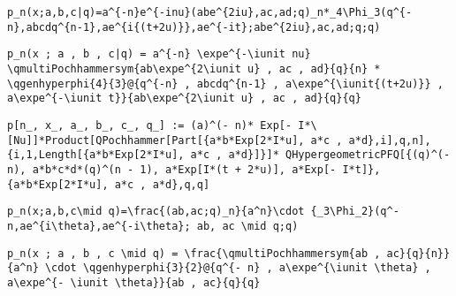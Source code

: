 \newsavebox\CXT
\begin{lrbox}{\CXT}
 \begin{minipage}[t]{0.82\textwidth}
  \lstinline[language={[latex]TeX},mathescape,breaklines=true]"p_n(x;a,b,c|q)=a^{-n}e^{-inu}(abe^{2iu},ac,ad;q)_n*_4\Phi_3(q^{-n},abcdq^{n-1},ae^{i{(t+2u)}},ae^{-it};abe^{2iu},ac,ad;q;q)"
 \end{minipage}
\end{lrbox}
\newsavebox\CXST
\begin{lrbox}{\CXST}
 \begin{minipage}[t]{0.82\textwidth}
  \lstinline[language={[latex]TeX},mathescape,breaklines=true]"p_n(x ; a , b , c|q) = a^{-n} \expe^{-\iunit nu} \qmultiPochhammersym{ab\expe^{2\iunit u} , ac , ad}{q}{n} * \qgenhyperphi{4}{3}@{q^{-n} , abcdq^{n-1} , a\expe^{\iunit{(t+2u)}} , a\expe^{-\iunit t}}{ab\expe^{2\iunit u} , ac , ad}{q}{q}"
 \end{minipage}
\end{lrbox}
\newsavebox\CXMM
\begin{lrbox}{\CXMM}
 \begin{minipage}[t]{0.82\textwidth}
  \lstinline[language={[latex]TeX},mathescape,breaklines=true]"p[n_, x_, a_, b_, c_, q_] := (a)^(- n)* Exp[- I*\[Nu]]*Product[QPochhammer[Part[{a*b*Exp[2*I*u], a*c , a*d},i],q,n],{i,1,Length[{a*b*Exp[2*I*u], a*c , a*d}]}]* QHypergeometricPFQ[{(q)^(- n), a*b*c*d*(q)^(n - 1), a*Exp[I*(t + 2*u)], a*Exp[- I*t]},{a*b*Exp[2*I*u], a*c , a*d},q,q]"
 \end{minipage}
\end{lrbox}
\newsavebox\CXMA
\begin{lrbox}{\CXMA}
 \begin{minipage}[t]{0.82\textwidth}
  \lstinline[language={[latex]TeX},mathescape,breaklines=true]""
 \end{minipage}
\end{lrbox}
\newsavebox\CYT
\begin{lrbox}{\CYT}
 \begin{minipage}[t]{0.82\textwidth}
  \lstinline[language={[latex]TeX},mathescape,breaklines=true]"p_n(x;a,b,c\mid q)=\frac{(ab,ac;q)_n}{a^n}\cdot {_3\Phi_2}(q^-n,ae^{i\theta},ae^{-i\theta}; ab, ac \mid q;q)"
 \end{minipage}
\end{lrbox}
\newsavebox\CYST
\begin{lrbox}{\CYST}
 \begin{minipage}[t]{0.82\textwidth}
  \lstinline[language={[latex]TeX},mathescape,breaklines=true]"p_n(x ; a , b , c \mid q) = \frac{\qmultiPochhammersym{ab , ac}{q}{n}}{a^n} \cdot \qgenhyperphi{3}{2}@{q^{- n} , a\expe^{\iunit \theta} , a\expe^{- \iunit \theta}}{ab , ac}{q}{q}"
 \end{minipage}
\end{lrbox}
